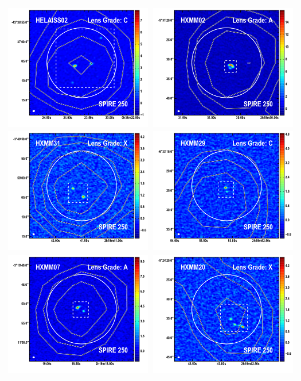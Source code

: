 \documentclass[iop]{emulateapj}
\begin{document}
\begin{figure}[!tbp] 
    \begin{centering}
\includegraphics[width=0.331\textwidth]{../Figures/overlays/HELAISS02_870_250.pdf}
\includegraphics[width=0.331\textwidth]{../Figures/overlays/HXMM02_870_250.pdf}
\includegraphics[width=0.331\textwidth]{../Figures/overlays/HXMM31_870_250.pdf}
\includegraphics[width=0.331\textwidth]{../Figures/overlays/HXMM29_870_250.pdf}
\includegraphics[width=0.331\textwidth]{../Figures/overlays/HXMM07_870_250.pdf}
\includegraphics[width=0.331\textwidth]{../Figures/overlays/HXMM20_870_250.pdf}

\end{centering}
\end{figure}
\end{document}
